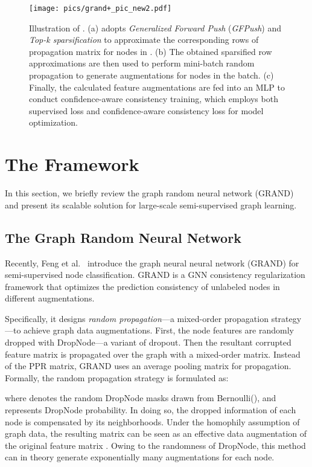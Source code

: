 


\begin{figure*}[ht]
	\centering
	\texttt{[image: pics/grand+\_pic\_new2.pdf]}
	\vspace{-0.15in}
	\caption{Illustration of \model.  \textmd{\small (a) \model adopts \textit{Generalized Forward Push} (\textit{GFPush}) and \textit{Top-k sparsification} to approximate the corresponding rows of propagation matrix  for nodes in . (b) The obtained sparsified row approximations are then used to perform mini-batch random propagation to generate augmentations for nodes in the batch. (c) Finally, the calculated feature augmentations are fed into an MLP to conduct confidence-aware consistency training, which employs both supervised loss  and confidence-aware consistency loss   for model optimization.}}
\label{fig:arc}
	\vspace{-0.06in}
\end{figure*}

\section{The \model Framework}
\label{sec:method}

In this section, we briefly review the graph random neural network (GRAND) and present its scalable solution \model for large-scale semi-supervised graph learning. 

\subsection{The Graph Random Neural Network}


Recently, Feng et al.~\cite{feng2020grand} introduce the graph neural neural network (GRAND) for semi-supervised node classification. 
GRAND is a GNN consistency regularization framework that optimizes the prediction consistency of unlabeled nodes in different augmentations. 


Specifically, it designs 
\textit{random propagation}---a mixed-order propagation strategy---to achieve graph data augmentations. 
First, the node features  are  randomly dropped with DropNode---a variant of dropout. 
Then the resultant corrupted feature matrix is propagated over the graph with a mixed-order matrix. 
Instead of the PPR matrix, GRAND uses an average pooling matrix  for propagation.
Formally, the random propagation strategy is formulated as: 

where  denotes the random DropNode masks drawn from Bernoulli(), and  represents DropNode probability. 
In doing so, the dropped information of each node is compensated by its neighborhoods. 
Under the homophily assumption of graph data, the resulting matrix  can be seen as an effective data augmentation of the original feature matrix . 
Owing to the randomness of DropNode, this method can in theory generate exponentially many augmentations for each node. 


